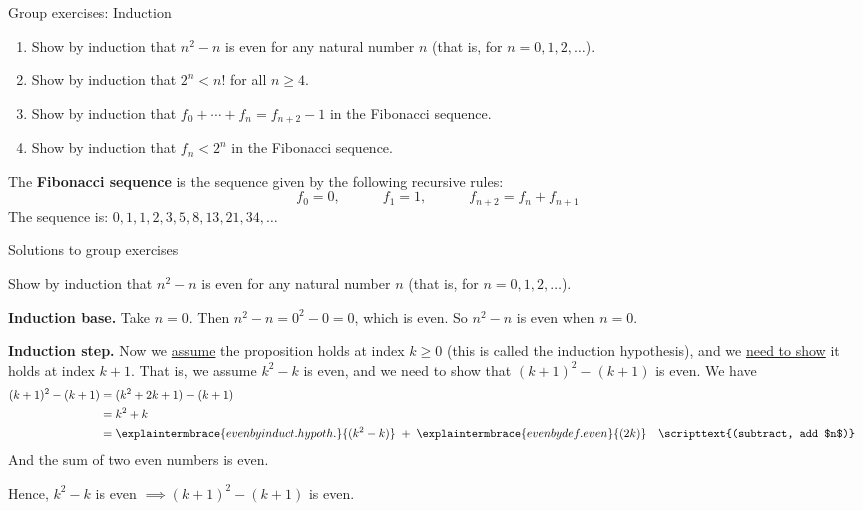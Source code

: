 \documentclass[10pt]{beamer}
\begin{document}
\begin{frame}{Group exercises: Induction}

\begin{enumerate}
\item Show by induction that $n^2-n$ is even for any natural number $n$ (that is, for $n=0,1,2,\hdots$).
\item  Show by induction that $2^n < n!$ for all $n \geq 4$.	
\item Show by induction that $f_0 + \cdots + f_n = f_{n+2} -1$ in the Fibonacci sequence.
\item Show by induction that $f_n < 2^n$ in the Fibonacci sequence. 
\end{enumerate}
\vfill 
\begin{mygreenbox}[title=Definition]
The \textbf{Fibonacci sequence} is the sequence given by the following recursive rules:
\[f_0 =0, \qquad \quad f_1 =1, \qquad \quad f_{n+2} = f_n + f_{n+1} \]
The sequence is: $0,1,1,2,3,5,8,13,21,34, \hdots$
\end{mygreenbox}


\end{frame}

\begin{frame}[standout]
Solutions to group exercises	
\end{frame}


\begin{frame}
\small 
\begin{mygreenbox}[title=Exercise 1]
Show by induction that $n^2-n$ is even for any natural number $n$ (that is, for $n=0,1,2,\hdots$).
\end{mygreenbox}

\vfill \vfill 
\begin{myyellowbox}[title=Solution (by Induction)]
\textbf{Induction base.} Take $n=0$.  Then $n^2-n = 0^2-0 = 0$, which is even. So $n^2-n$ is even when $n=0$.

\vspace{0.5cm}

\textbf{Induction step.} Now we \underline{assume} the proposition holds at index $k \geq 0$ (this is called the \alert{induction hypothesis}), and we \underline{need to show} it holds at index $k+1$.  That is, we assume $k^2-k$ is even, and we need to show that $(k+1)^2-(k+1)$ is even.  We have
%
\begin{align*}
(k+1)^2-(k+1) &= (k^2+2k+1) - (k+1) \\
&= k^2+k  \\
&= \explaintermbrace{even by induct. hypoth.}{(k^2 -k)} \; + \; \explaintermbrace{even by def. even}{(2k)}  && \scripttext{(subtract, add $n$)}	
\end{align*}
And the sum of two even numbers is even.

Hence, $k^2-k$ is even $\implies (k+1)^2-(k+1)$ is even.
\end{myyellowbox}

\end{frame}
\end{document}
